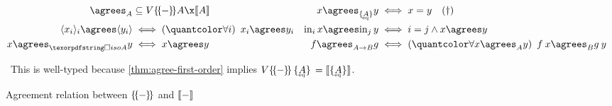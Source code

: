 \begin{figure*}
  \begin{align*}
    {\agrees_A} &\subseteq \vals{\incdens{A}} \x \den{A} &
    x \agrees_{\tseteq A} y &\iff x = y \quad(\text{\textdagger})\\
    \tuple{x_i}_i \agrees \tuple{y_i} &\iff \fa{i} x_i \agrees y_i &
    \inj i x \agrees \inj j y &\iff i = j \wedge x \agrees y\\
    x \agrees_{\isof A} y &\iff x \agrees y &
    f \agrees_{A \to B} g &\iff \fa{x \agrees_A y} f\<x \agrees_B g\<y
  \end{align*}

  \small \textdagger\ This is well-typed because \cref{thm:agree-first-order}
  implies $\vals{\incdens{\,\tseteq{A}\,}} = \den{\tseteq{A}}$.

  \caption{Agreement relation between $\{\kern-.18em\{\kern-.05em{-}\kern-.05em\}\kern -.18em\}$ and $\llbracket{-}\rrbracket$}
  \label{fig:agrees}
\end{figure*}
